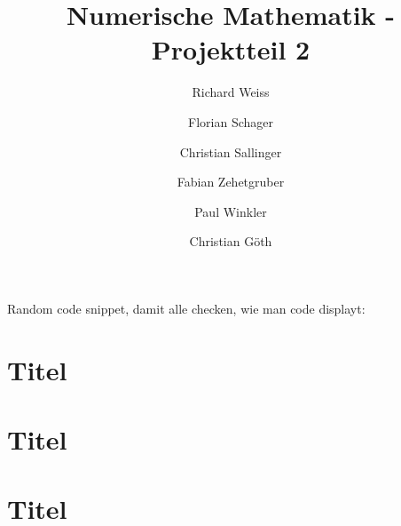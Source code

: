 \documentclass{article}
\title{Numerische Mathematik - Projektteil 2}
\author
{
  Richard Weiss       \and
  Florian Schager     \and
  Christian Sallinger \and
  Fabian Zehetgruber  \and
  Paul Winkler        \and
  Christian Göth
}
\date{}
\begin{document}
\maketitle

Random code snippet, damit alle checken, wie man code displayt:


\section{Titel}


\section{Titel}


\section{Titel}

\end{document}
